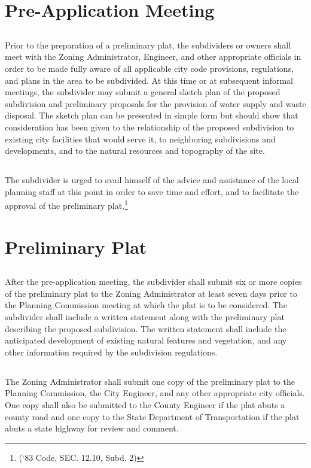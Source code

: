 \section{Pre-Application Meeting}
\subsection{}
Prior to the preparation of a preliminary plat, the subdividers or owners shall meet with the Zoning Administrator, Engineer, and other appropriate officials in order to be made fully aware of all applicable city code provisions, regulations, and plans in the area to be subdivided. At this time or at subsequent informal meetings, the subdivider may submit a general sketch plan of the proposed subdivision and preliminary proposals for the provision of water supply and waste disposal. The sketch plan can be presented in simple form but should show that consideration has been given to the relationship of the proposed subdivision to existing city facilities that would serve it, to neighboring subdivisions and developments, and to the natural resources and topography of the site.
\subsection{}
The subdivider is urged to avail himself of the advice and assistance of the local planning staff at this point in order to save time and effort, and to facilitate the approval of the preliminary plat.\footnote{(‘83 Code, SEC. 12.10, Subd. 2)}
\section{Preliminary Plat}
\subsection{}
After the pre-application meeting, the subdivider shall submit six or more copies of the preliminary plat to the Zoning Administrator at least seven days prior to the Planning Commission meeting at which the plat is to be considered. The subdivider shall include a written statement along with the preliminary plat describing the proposed subdivision. The written statement shall include the anticipated development of existing natural features and vegetation, and any other information required by the subdivision regulations.
\subsection{}
The Zoning Administrator shall submit one copy of the preliminary plat to the Planning Commission, the City Engineer, and any other appropriate city officials. One copy shall also be submitted to the County Engineer if the plat abuts a county road and one copy to the State Department of Transportation if the plat abuts a state highway for review and comment.
